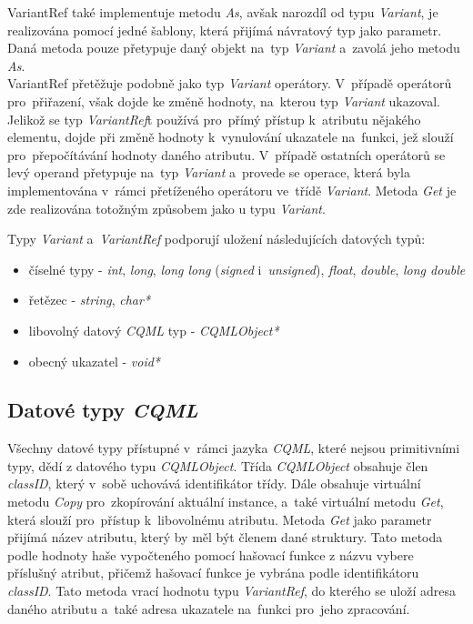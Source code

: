 \documentclass[11pt,twoside,a4paper]{book}
\begin{document}
VariantRef také implementuje metodu \textit{As}, avšak narozdíl od typu \textit{Variant}, je realizována pomocí jedné šablony, která přijímá návratový typ jako parametr. Daná metoda pouze přetypuje daný objekt na~typ \textit{Variant} a~zavolá jeho metodu \textit{As}.\\
VariantRef přetěžuje podobně jako typ \textit{Variant} operátory. V~případě operátorů pro~přiřazení, však dojde ke změně hodnoty, na~kterou typ \textit{Variant} ukazoval. Jelikož se typ \textit{VariantRef}t používá pro~přímý přístup k~atributu nějakého elementu, dojde při změně hodnoty k~vynulování ukazatele na~funkci, jež slouží pro~přepočítávání hodnoty daného atributu. V~případě ostatních operátorů se levý operand přetypuje na~typ \textit{Variant} a~provede se operace, která byla implementována v~rámci přetíženého operátoru ve~třídě \textit{Variant}. Metoda \textit{Get} je zde realizována totožným způsobem jako u typu \textit{Variant}.

Typy \textit{Variant} a~\textit{VariantRef} podporují uložení následujících datových typů:
\begin{itemize}
\item číselné typy - \textit{int}, \textit{long}, \textit{long long} (\textit{signed} i~\textit{unsigned}), \textit{float}, \textit{double}, \textit{long double}
\item řetězec - \textit{string}, \textit{char*}
\item libovolný datový \textit{CQML} typ - \textit{CQMLObject*}
\item obecný ukazatel - \textit{void*}
\end{itemize}

\subsection{Datové typy \textit{CQML}}
Všechny datové typy přístupné v~rámci jazyka \textit{CQML}, které nejsou primitivními typy, dědí z datového typu \textit{CQMLObject}. Třída \textit{CQMLObject} obsahuje člen \textit{classID}, který v~sobě uchovává identifikátor třídy. Dále obsahuje virtuální metodu \textit{Copy} pro~zkopírování aktuální instance, a~také virtuální metodu \textit{Get}, která slouží pro~přístup k~libovolnému atributu. Metoda \textit{Get} jako parametr přijímá název atributu, který by měl být členem dané struktury. Tato metoda podle hodnoty haše vypočteného pomocí hašovací funkce z názvu vybere příslušný atribut, přičemž hašovací funkce je vybrána podle identifikátoru \textit{classID}. Tato metoda vrací hodnotu typu \textit{VariantRef}, do kterého se uloží adresa daného atributu a~také adresa ukazatele na~funkci pro~jeho zpracování.\\
\end{document}
